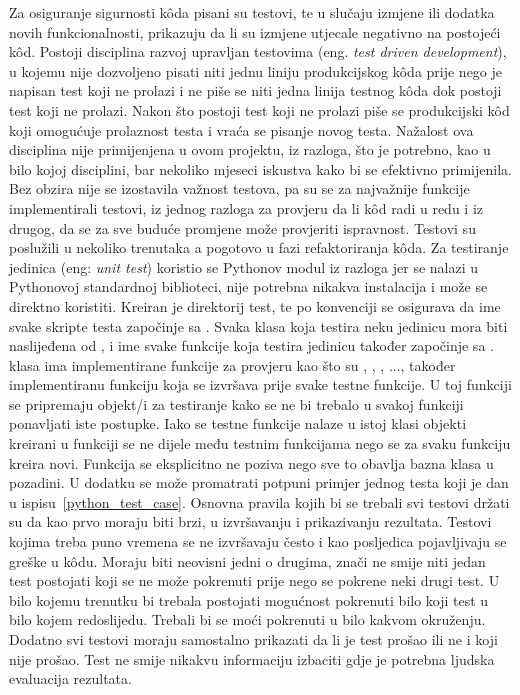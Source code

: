 Za osiguranje sigurnosti k\^oda pisani su testovi, te u slučaju izmjene ili dodatka novih funkcionalnosti, prikazuju da li su izmjene utjecale negativno na postojeći k\^od. Postoji disciplina razvoj upravljan testovima (eng. \textit{test driven development}), u kojemu nije dozvoljeno pisati niti jednu liniju produkcijskog k\^oda prije nego je napisan test koji ne prolazi i ne piše se niti jedna linija testnog k\^oda dok postoji test koji ne prolazi. Nakon što postoji test koji ne prolazi piše se produkcijski k\^od koji omogućuje prolaznost testa i vraća se pisanje novog testa. Nažalost ova disciplina nije primijenjena u ovom projektu, iz razloga, što je potrebno, kao u bilo kojoj disciplini, bar nekoliko mjeseci iskustva kako bi se efektivno primijenila. Bez obzira nije se izostavila važnost testova, pa su se za najvažnije funkcije implementirali testovi, iz jednog razloga za provjeru da li k\^od radi u redu i iz drugog, da se za sve buduće promjene može provjeriti ispravnost. Testovi su poslužili u nekoliko trenutaka a pogotovo u fazi refaktoriranja k\^oda. Za testiranje jedinica (eng: \textit{unit test}) koristio se Pythonov modul  iz razloga jer se nalazi u Pythonovoj standardnoj biblioteci, nije potrebna nikakva instalacija i može se direktno koristiti. Kreiran je direktorij test, te po konvenciji se osigurava da ime svake skripte testa započinje sa . Svaka klasa koja testira neku jedinicu mora biti naslijeđena od , i ime svake funkcije koja testira jedinicu također započinje sa .  klasa ima implementirane funkcije za provjeru kao što su , , , ..., također implementiranu funkciju  koja se izvršava prije svake testne funkcije. U toj funkciji se pripremaju objekt/i za testiranje kako se ne bi trebalo u svakoj funkciji ponavljati iste postupke. Iako se testne funkcije nalaze u istoj klasi objekti kreirani u  funkciji se ne dijele među testnim funkcijama nego se za svaku funkciju kreira novi. Funkcija  se eksplicitno ne poziva nego sve to obavlja bazna klasa  u pozadini. U dodatku se može promatrati potpuni primjer jednog testa koji je dan u ispisu~\ref{python_test_case}. Osnovna pravila kojih bi se trebali svi testovi držati su da kao prvo moraju biti brzi, u izvršavanju i prikazivanju rezultata. Testovi kojima treba puno vremena se ne izvršavaju često i kao posljedica pojavljivaju se greške u k\^odu. Moraju biti neovisni jedni o drugima, znači ne smije niti jedan test postojati koji se ne može pokrenuti prije nego se pokrene neki drugi test. U bilo kojemu trenutku bi trebala postojati mogućnost pokrenuti bilo koji test u bilo kojem redoslijedu. Trebali bi se moći pokrenuti u bilo kakvom okruženju. Dodatno svi testovi moraju samostalno prikazati da li je test prošao ili ne i koji nije prošao. Test ne smije nikakvu informaciju izbaciti gdje je potrebna ljudska evaluacija rezultata.

